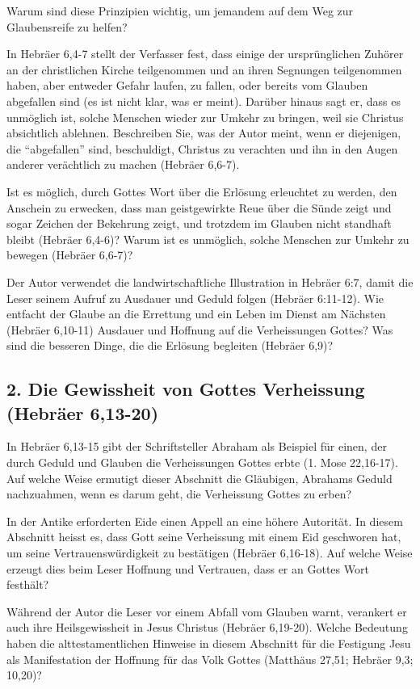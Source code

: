 \documentclass[]{krantz}
\begin{document}
Warum sind diese Prinzipien wichtig, um jemandem auf dem Weg zur
Glaubensreife zu helfen?

In Hebräer 6,4-7 stellt der Verfasser fest, dass einige der
ursprünglichen Zuhörer an der christlichen Kirche teilgenommen und an
ihren Segnungen teilgenommen haben, aber entweder Gefahr laufen, zu
fallen, oder bereits vom Glauben abgefallen sind (es ist nicht klar, was
er meint). Darüber hinaus sagt er, dass es unmöglich ist, solche
Menschen wieder zur Umkehr zu bringen, weil sie Christus absichtlich
ablehnen. Beschreiben Sie, was der Autor meint, wenn er diejenigen, die
``abgefallen'' sind, beschuldigt, Christus zu verachten und ihn in den
Augen anderer verächtlich zu machen (Hebräer 6,6-7).

Ist es möglich, durch Gottes Wort über die Erlösung erleuchtet zu
werden, den Anschein zu erwecken, dass man geistgewirkte Reue über die
Sünde zeigt und sogar Zeichen der Bekehrung zeigt, und trotzdem im
Glauben nicht standhaft bleibt (Hebräer 6,4-6)? Warum ist es unmöglich,
solche Menschen zur Umkehr zu bewegen (Hebräer 6,6-7)?

Der Autor verwendet die landwirtschaftliche Illustration in Hebräer 6:7,
damit die Leser seinem Aufruf zu Ausdauer und Geduld folgen (Hebräer
6:11-12). Wie entfacht der Glaube an die Errettung und ein Leben im
Dienst am Nächsten (Hebräer 6,10-11) Ausdauer und Hoffnung auf die
Verheissungen Gottes? Was sind die besseren Dinge, die die Erlösung
begleiten (Hebräer 6,9)?

\subsection{2. Die Gewissheit von Gottes Verheissung (Hebräer
6,13-20)}\label{die-gewissheit-von-gottes-verheissung-hebruxe4er-613-20}

In Hebräer 6,13-15 gibt der Schriftsteller Abraham als Beispiel für
einen, der durch Geduld und Glauben die Verheissungen Gottes erbte (1.
Mose 22,16-17). Auf welche Weise ermutigt dieser Abschnitt die
Gläubigen, Abrahams Geduld nachzuahmen, wenn es darum geht, die
Verheissung Gottes zu erben?

In der Antike erforderten Eide einen Appell an eine höhere Autorität. In
diesem Abschnitt heisst es, dass Gott seine Verheissung mit einem Eid
geschworen hat, um seine Vertrauenswürdigkeit zu bestätigen (Hebräer
6,16-18). Auf welche Weise erzeugt dies beim Leser Hoffnung und
Vertrauen, dass er an Gottes Wort festhält?

Während der Autor die Leser vor einem Abfall vom Glauben warnt,
verankert er auch ihre Heilsgewissheit in Jesus Christus (Hebräer
6,19-20). Welche Bedeutung haben die alttestamentlichen Hinweise in
diesem Abschnitt für die Festigung Jesu als Manifestation der Hoffnung
für das Volk Gottes (Matthäus 27,51; Hebräer 9,3; 10,20)?
\end{document}
